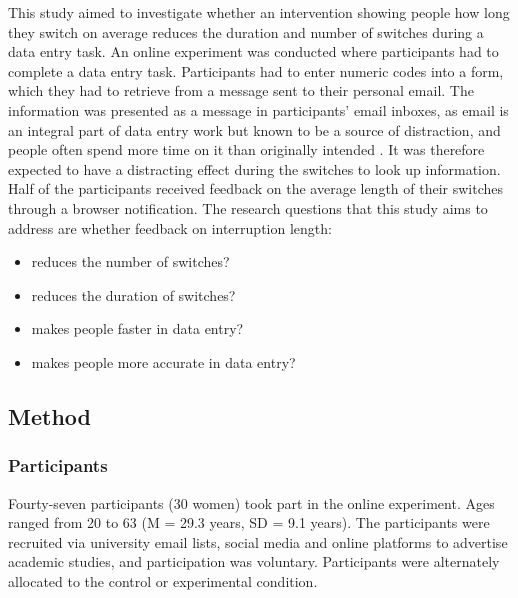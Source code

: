 This study aimed to investigate whether an intervention showing people how long they switch on average reduces the duration and number of switches during a data entry task. An online experiment was conducted where participants had to complete a data entry task. Participants had to enter numeric codes into a form, which they had to retrieve from a message sent to their personal email. The information was presented as a message in participants' email inboxes, as email is an integral part of data entry work but known to be a source of distraction, and people often spend more time on it than originally intended \citep{Hanrahan2015, Mark2016}. It was therefore expected to have a distracting effect during the switches to look up information. Half of the participants received feedback on the average length of their switches through a browser notification. 
The research questions that this study aims to address are whether feedback on interruption length:

\begin{itemize}
\item
reduces the number of switches?
\item
 reduces the duration of switches?
\item
makes people faster in data entry?
\item
makes people more accurate in data entry?
\end{itemize}

\subsection{Method}
\subsubsection{Participants}
Fourty-seven participants (30 women) took part in the online experiment. Ages ranged from 20 to 63 (M = 29.3 years, SD = 9.1 years). The participants were recruited via university email lists, social media and online platforms to advertise academic studies, and participation was voluntary. Participants were alternately allocated to the control or experimental condition.

